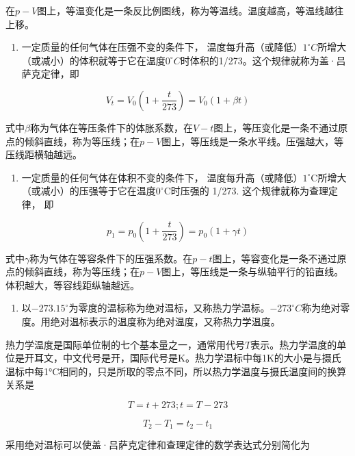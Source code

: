 在\(p - V\)图上，等温变化是一条反比例图线，称为等温线。温度越高，等温线越往上移。

\begin{enumerate}
\def\labelenumi{\arabic{enumi}.}
\setcounter{enumi}{2}
\tightlist
\item
  一定质量的任何气体在压强不变的条件下，
  温度每升高（或降低）\(1^{\circ}C\)所增大（或减小）的体积就等于它在温度\(0^{\circ}C\)时体积的1/273。这个规律就称为盖·吕萨克定律，即
\end{enumerate}

\[
V _ {t} = V _ {0} \left(1 + \frac {t}{273}\right) = V _ {0} (1 + \beta t)
\]

式中\(\beta\)称为气体在等压条件下的体胀系数，在\(V - t\)图上，等压变化是一条不通过原点的倾斜直线，称为等压线；在\(p - V\)图上，等压线是一条水平线。压强越大，等压线距横轴越远。

\begin{enumerate}
\def\labelenumi{\arabic{enumi}.}
\setcounter{enumi}{3}
\tightlist
\item
  一定质量的任何气体在体积不变的条件下，
  温度每升高（或降低）\(1^{\circ} \mathrm{C}\)所增大（或减小）的压强等于它在温度\(0^{\circ} \mathrm{C}\)时压强的
  1/273. 这个规律就称为查理定律， 即
\end{enumerate}

\[
p _ {1} = p _ {0} \left(1 + \frac {t}{273}\right) = p _ {0} (1 + \gamma t)
\]

式中\(\gamma\)称为气体在等容条件下的压强系数。在\(p - t\)图上，等容变化是一条不通过原点的倾斜直线，称为等压线；在\(p - V\)图上，等压线是一条与纵轴平行的铅直线。体积越大，等容线距纵轴越远。

\begin{enumerate}
\def\labelenumi{\arabic{enumi}.}
\setcounter{enumi}{4}
\tightlist
\item
  以\(-273.15^{\circ}\)为零度的温标称为绝对温标，又称热力学温标。\(-273^{\circ}C\)称为绝对零度。用绝对温标表示的温度称为绝对温度，又称热力学温度。
\end{enumerate}

热力学温度是国际单位制的七个基本量之一，通常用代号\(T\)表示。热力学温度的单位是开耳文，中文代号是开，国际代号是K。热力学温标中每1K的大小是与摄氏温标中每1°C相同的，只是所取的零点不同，所以热力学温度与摄氏温度间的换算关系是

\[
T = t + 273; t = T - 273
\]

\[
T _ {2} - T _ {1} = t _ {2} - t _ {1}
\]

采用绝对温标可以使盖·吕萨克定律和查理定律的数学表达式分别简化为

